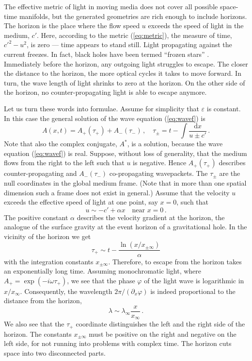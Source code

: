 \documentclass[12pt,amsmath,amssymb]{article}
\numberwithin{equation}{section}
\begin{document}
The effective metric of light in moving media \cite{Gordon,LeoSpace}
does not cover all possible space-time manifolds, but the
generated geometries are rich enough to include horizons.
The horizon is the place where the flow speed $u$ exceeds the
speed of light in the medium, $c'$.
Here, according to the metric (\ref{eq:metric}),
the measure of time, $c'^2-u^2$, is zero --- time appears to stand still.
Light propagating against the current freezes.
In fact, black holes have been termed ``frozen stars'' \cite{Harrison}.
Immediately before the horizon, any outgoing light struggles to escape.
The closer the distance to the horizon, the more optical cycles
it takes to move forward. In turn, the wave length of light
shrinks to zero at the horizon.
On the other side of the horizon, no counter-propagating light
is able to escape anymore.

Let us turn these words into formulae.
Assume for simplicity that $\varepsilon$ is constant.
In this case the general solution of the wave equation (\ref{eq:wavef}) is
\begin{equation}
\label{eq:axt}
A(x,t) = A_+(\tau_+) + A_-(\tau_-) \,,\quad
\tau_\pm = t - \int\frac{\mathrm{d}x}{u \pm c'} \,.
\end{equation}
Note that also the complex conjugate, $A^*$, is a solution,
because the wave equation (\ref{eq:wavef}) is real.
Suppose, without loss of generality, that the medium flows from the
right to the left such that $u$ is negative.
Hence $A_+(\tau_+)$ describes counter-propagating and $A_-(\tau_-)$
co-propagating wavepackets. The $\tau_\pm$ are the null coordinates
in the global medium frame. (Note that in more than one spatial
dimension such a frame does not exist in general.)
Assume that the velocity $u$ exceeds the effective speed of light at
one point, say $x=0$, such that
\begin{equation}
u \sim -c' + \alpha x \quad \mbox{near}\,\, x=0 \,.
\end{equation}
The positive constant $\alpha$ describes the velocity gradient
at the horizon, the analogue of the surface gravity
at the event horizon of a gravitational hole.
In the vicinity of the horizon we get
\begin{equation}
\tau_+ \sim t - \frac{\ln (x/x_{\pm\infty})}{\alpha}
\end{equation}
with the integration constants $x_{\pm\infty}$.
Therefore, to escape from the horizon
takes an exponentially long time.
Assuming monochromatic light, where
$A_+=\exp(-i\omega\tau_+)$,  we see that
the phase $\varphi$ of the light wave is logarithmic in $x/x_{\infty}$.
Consequently, the wavelength $2\pi/(\partial_x\varphi)$
is indeed proportional to the distance from the horizon,
\begin{equation}
\lambda \sim \lambda_{\infty} \frac{x}{x_{\infty}} \,.
\end{equation}
We also see that the $\tau_+$ coordinate distinguishes
the left and the right side of the horizon.
The constants $x_{\pm\infty}$ must be positive on the right
and negative on the left side, for not running into problems
with complex time.
The horizon cuts space into two disconnected parts.
\end{document}
